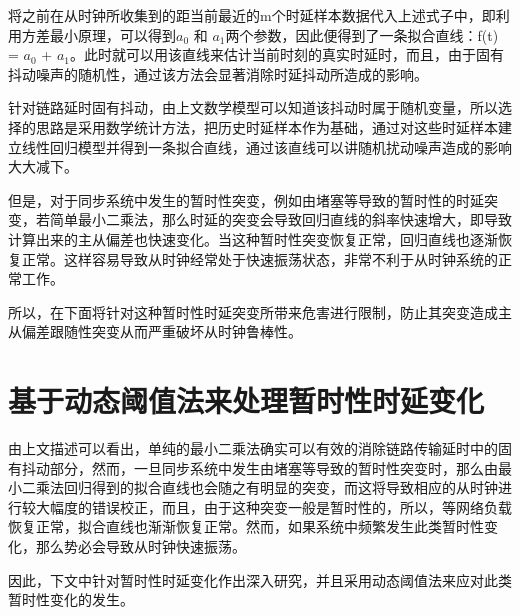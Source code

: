 将之前在从时钟所收集到的距当前最近的m个时延样本数据代入上述式子中，即利用方差最小原理，可以得到$a_{0}$ 和 $a_{1}$两个参数，因此便得到了一条拟合直线：f(t) = $a_{0}$ + $a_{1}$。此时就可以用该直线来估计当前时刻的真实时延时，而且，由于固有抖动噪声的随机性，通过该方法会显著消除时延抖动所造成的影响。

针对链路延时固有抖动，由上文数学模型可以知道该抖动时属于随机变量，所以选择的思路是采用数学统计方法，把历史时延样本作为基础，通过对这些时延样本建立线性回归模型并得到一条拟合直线，通过该直线可以讲随机扰动噪声造成的影响大大减下。

但是，对于同步系统中发生的暂时性突变，例如由堵塞等导致的暂时性的时延突变，若简单最小二乘法，那么时延的突变会导致回归直线的斜率快速增大，即导致计算出来的主从偏差也快速变化。当这种暂时性突变恢复正常，回归直线也逐渐恢复正常。这样容易导致从时钟经常处于快速振荡状态，非常不利于从时钟系统的正常工作。

所以，在下面将针对这种暂时性时延突变所带来危害进行限制，防止其突变造成主从偏差跟随性突变从而严重破坏从时钟鲁棒性。

\section{基于动态阈值法来处理暂时性时延变化}
由上文描述可以看出，单纯的最小二乘法确实可以有效的消除链路传输延时中的固有抖动部分，然而，一旦同步系统中发生由堵塞等导致的暂时性突变时，那么由最小二乘法回归得到的拟合直线也会随之有明显的突变，而这将导致相应的从时钟进行较大幅度的错误校正，而且，由于这种突变一般是暂时性的，所以，等网络负载恢复正常，拟合直线也渐渐恢复正常。然而，如果系统中频繁发生此类暂时性变化，那么势必会导致从时钟快速振荡。

因此，下文中针对暂时性时延变化作出深入研究，并且采用动态阈值法来应对此类暂时性变化的发生。


